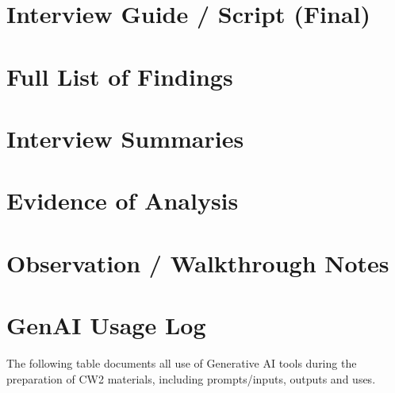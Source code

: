 \documentclass[a4paper,11pt]{article}
\begin{document}
\newpage
\section{Interview Guide / Script (Final)}\label{app:guide}

\newpage
\section{Full List of Findings}\label{app:findings}

\newpage
\section{Interview Summaries}\label{app:summaries}

\newpage
\section{Evidence of Analysis}\label{app:analysis}

\newpage
\section{Observation / Walkthrough Notes}\label{app:observation}

\newpage
\section{GenAI Usage Log}\label{app:genai}

The following table documents all use of Generative AI tools during the
preparation of CW2 materials, including prompts/inputs, outputs and uses.
\end{document}
